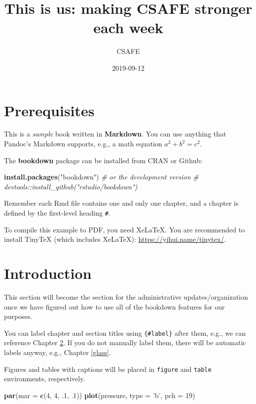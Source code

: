 \documentclass[]{book}
\title{This is us: making CSAFE stronger each week}
\author{CSAFE}
\date{2019-09-12}
\newenvironment{Shaded}{\begin{snugshade}}{\end{snugshade}}
\newcommand{\CommentTok}[1]{\textcolor[rgb]{0.56,0.35,0.01}{\textit{#1}}}
\newcommand{\DataTypeTok}[1]{\textcolor[rgb]{0.13,0.29,0.53}{#1}}
\newcommand{\DecValTok}[1]{\textcolor[rgb]{0.00,0.00,0.81}{#1}}
\newcommand{\FloatTok}[1]{\textcolor[rgb]{0.00,0.00,0.81}{#1}}
\newcommand{\KeywordTok}[1]{\textcolor[rgb]{0.13,0.29,0.53}{\textbf{#1}}}
\newcommand{\NormalTok}[1]{#1}
\newcommand{\StringTok}[1]{\textcolor[rgb]{0.31,0.60,0.02}{#1}}
\begin{document}
\maketitle

{
\setcounter{tocdepth}{1}
\tableofcontents
}
\hypertarget{prerequisites}{%
\chapter{Prerequisites}\label{prerequisites}}

This is a \emph{sample} book written in \textbf{Markdown}. You can use anything that Pandoc's Markdown supports, e.g., a math equation \(a^2 + b^2 = c^2\).

The \textbf{bookdown} package can be installed from CRAN or Github:

\begin{Shaded}
\begin{Highlighting}[]
\KeywordTok{install.packages}\NormalTok{(}\StringTok{"bookdown"}\NormalTok{)}
\CommentTok{# or the development version}
\CommentTok{# devtools::install_github("rstudio/bookdown")}
\end{Highlighting}
\end{Shaded}

Remember each Rmd file contains one and only one chapter, and a chapter is defined by the first-level heading \texttt{\#}.

To compile this example to PDF, you need XeLaTeX. You are recommended to install TinyTeX (which includes XeLaTeX): \url{https://yihui.name/tinytex/}.

\hypertarget{intro}{%
\chapter{Introduction}\label{intro}}

This section will become the section for the administrative updates/organization once we have figured out how to use all of the bookdown features for our purposes.

You can label chapter and section titles using \texttt{\{\#label\}} after them, e.g., we can reference Chapter \ref{intro}. If you do not manually label them, there will be automatic labels anyway, e.g., Chapter \ref{glass}.

Figures and tables with captions will be placed in \texttt{figure} and \texttt{table} environments, respectively.

\begin{Shaded}
\begin{Highlighting}[]
\KeywordTok{par}\NormalTok{(}\DataTypeTok{mar =} \KeywordTok{c}\NormalTok{(}\DecValTok{4}\NormalTok{, }\DecValTok{4}\NormalTok{, }\FloatTok{.1}\NormalTok{, }\FloatTok{.1}\NormalTok{))}
\KeywordTok{plot}\NormalTok{(pressure, }\DataTypeTok{type =} \StringTok{'b'}\NormalTok{, }\DataTypeTok{pch =} \DecValTok{19}\NormalTok{)}
\end{Highlighting}
\end{Shaded}
\end{document}
